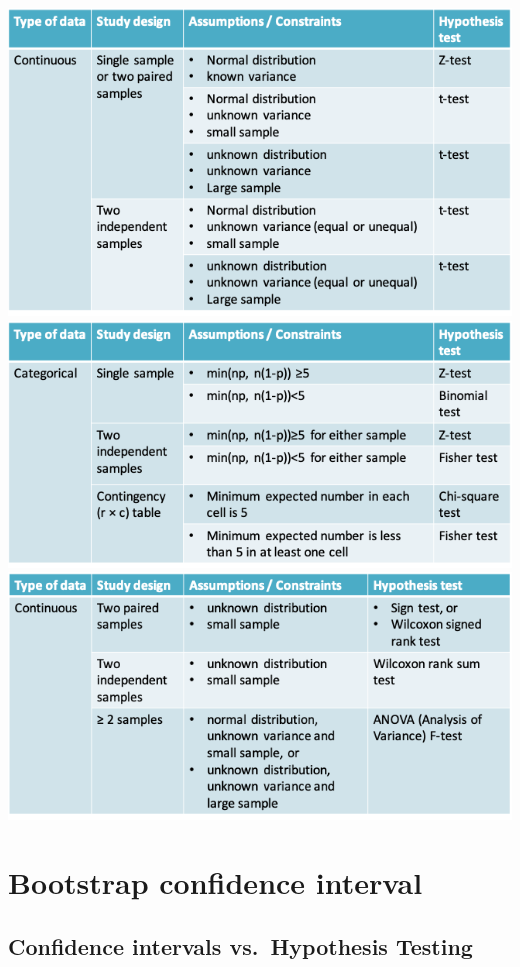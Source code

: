 \documentclass[
]{book}
\begin{document}
\includegraphics[width=1\linewidth]{./9_40}
\includegraphics[width=1\linewidth]{./9_41}
\includegraphics[width=1\linewidth]{./9_42}

\hypertarget{bootstrap-confidence-interval}{%
\section{Bootstrap confidence interval}\label{bootstrap-confidence-interval}}

\hypertarget{confidence-intervals-vs.-hypothesis-testing}{%
\subsection{Confidence intervals vs.~Hypothesis Testing}\label{confidence-intervals-vs.-hypothesis-testing}}
\end{document}
